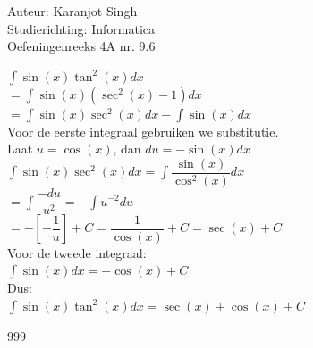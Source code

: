 \documentclass[a4paper]{article}
\begin{document}
\noindent \large Auteur: Karanjot Singh \\
\noindent \large Studierichting: Informatica \\
\noindent \large Oefeningenreeks 4A nr. 9.6 \\

\normalsize

$\displaystyle\int \sin(x) \tan^2(x) dx$ \\

$= \displaystyle\int \sin(x) (\sec^2(x) - 1) dx$ \\

$= \displaystyle\int \sin(x) \sec^2(x) dx - \displaystyle\int \sin(x) dx$ \\

Voor de eerste integraal gebruiken we substitutie. \\

Laat $u = \cos(x)$, dan $du = -\sin(x) dx$ \\

$\displaystyle\int \sin(x) \sec^2(x) dx = \displaystyle\int \dfrac{\sin(x)}{\cos^2(x)} dx$ \\

$= \displaystyle\int \dfrac{-du}{u^2} = -\displaystyle\int u^{-2} du$ \\

$= -\left[ -\dfrac{1}{u} \right] + C = \dfrac{1}{\cos(x)} + C = \sec(x) + C$ \\

Voor de tweede integraal: \\

$\displaystyle\int \sin(x) dx = -\cos(x) + C$ \\

Dus: \\

$\displaystyle\int \sin(x) \tan^2(x) dx = \sec(x) + \cos(x) + C$ \\

\begin{thebibliography}{999}
\end{thebibliography}
\end{document}
